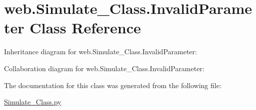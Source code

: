 \hypertarget{classweb_1_1_simulate___class_1_1_invalid_parameter}{\section{web.\-Simulate\-\_\-\-Class.\-Invalid\-Parameter Class Reference}
\label{classweb_1_1_simulate___class_1_1_invalid_parameter}
}


Inheritance diagram for web.\-Simulate\-\_\-\-Class.\-Invalid\-Parameter\-:


Collaboration diagram for web.\-Simulate\-\_\-\-Class.\-Invalid\-Parameter\-:


The documentation for this class was generated from the following file\-:\begin{DoxyCompactItemize}
\item 
\hyperlink{_simulate___class_8py}{Simulate\-\_\-\-Class.\-py}\end{DoxyCompactItemize}
